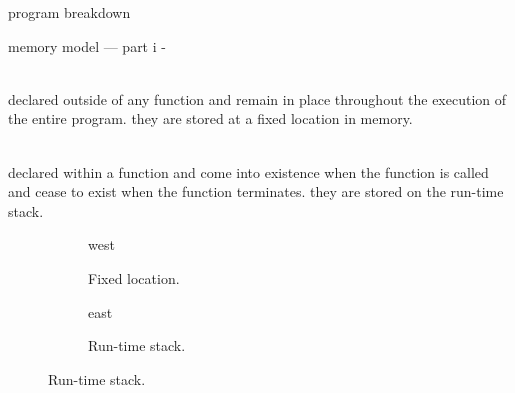 \documentclass[10pt,t,svgnames]{beamer}
\makeatletter
\newlength\tightleftmargin{}
\newlength\diffleftmargin{}
\providecommand{\nextline}{
  \setlength\labelwidth{\tightleftmargin}
  \setlength\leftmargin{\tightleftmargin}
  \advance\linewidth\diffleftmargin{}
  \advance\@totalleftmargin-\diffleftmargin{}
  \parshape\@ne\@totalleftmargin\linewidth{}
  \setlength\itemsep{1.5ex}
}
\let\origdescription\description
\let\endorigdescription\enddescription
\renewenvironment{description}{\origdescription\nextline}{\endorigdescription}
\makeatother
\begin{document}
\begin{frame}[fragile]{program breakdown}
  \end{frame}

  \begin{frame}{memory model --- part i}
    \begin{description}
      \item[global variables] \hfill \\ declared outside of any function and
        remain in place throughout the execution of the entire program. they are
        stored at a fixed location in memory.
      \item[local variables] \hfill \\ declared within a function and come into
        existence when the function is called and cease to exist when the
        function terminates. they are stored on the run-time stack.
    \end{description}

    \vspace{1\baselineskip}

    \begin{figure}
      \centering
      \begin{subfigure}[b]{.30\textwidth}
        \centering
        \begin{tikzstack}[bg]
          \begin{stack}{west}
          \end{stack}
        \end{tikzstack}
        \caption{Fixed location.}
      \end{subfigure}
      \quad
      \begin{subfigure}[b]{.30\textwidth}
        \centering
        \begin{tikzstack}[fg]
          \begin{stack}{east}
          \end{stack}
        \end{tikzstack}
        \caption{Run-time stack.}
      \end{subfigure}
    \end{figure}

  \end{frame}
\end{document}
